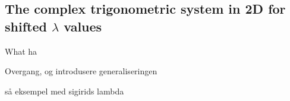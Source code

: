 \documentclass[../thesis.tex]{subfiles}
\begin{document}
\subsection[]{The complex trigonometric system in 2D for shifted $\lambda$ values}
What ha


Overgang, og introdusere generaliseringen


så eksempel med sigirids lambda 
\end{document}

